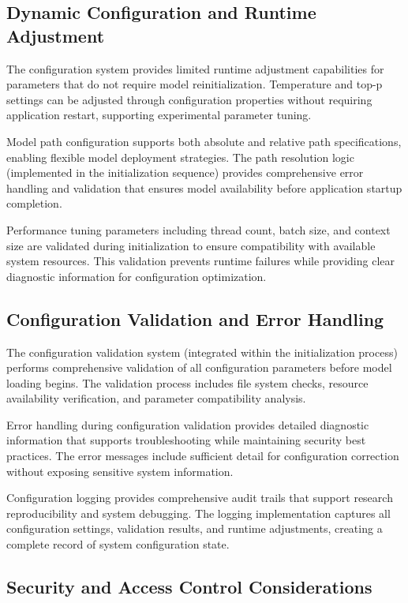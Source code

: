 \subsection{Dynamic Configuration and Runtime Adjustment}

The configuration system provides limited runtime adjustment capabilities for parameters that do not require model reinitialization. Temperature and top-p settings can be adjusted through configuration properties without requiring application restart, supporting experimental parameter tuning.

Model path configuration supports both absolute and relative path specifications, enabling flexible model deployment strategies. The path resolution logic (implemented in the initialization sequence) provides comprehensive error handling and validation that ensures model availability before application startup completion.

Performance tuning parameters including thread count, batch size, and context size are validated during initialization to ensure compatibility with available system resources. This validation prevents runtime failures while providing clear diagnostic information for configuration optimization.

\subsection{Configuration Validation and Error Handling}

The configuration validation system (integrated within the initialization process) performs comprehensive validation of all configuration parameters before model loading begins. The validation process includes file system checks, resource availability verification, and parameter compatibility analysis.

Error handling during configuration validation provides detailed diagnostic information that supports troubleshooting while maintaining security best practices. The error messages include sufficient detail for configuration correction without exposing sensitive system information.

Configuration logging provides comprehensive audit trails that support research reproducibility and system debugging. The logging implementation captures all configuration settings, validation results, and runtime adjustments, creating a complete record of system configuration state.

\subsection{Security and Access Control Considerations}

